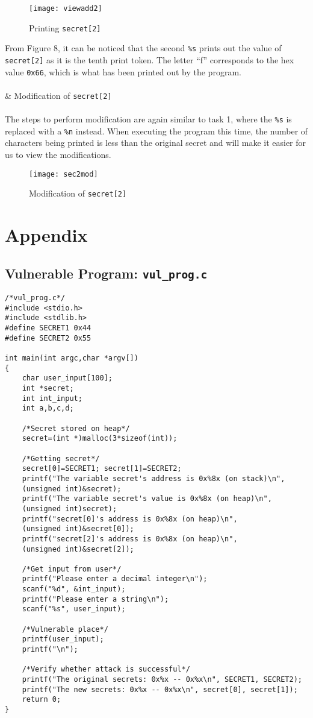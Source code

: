 \documentclass[a4paper,12pt]{article}
\newcommand*\circled[1]{\tikz[baseline=(char.base)]{
		\node[shape=circle,draw,inner sep=2pt] (char) {#1};}}
\begin{document}
\begin{figure}[H]
	\centering
	\texttt{[image: viewadd2]}
	\caption{Printing \texttt{secret[2]}}
	\label{fig:viewadd2}
\end{figure}
\noindent From Figure 8, it can be noticed that the second \texttt{\%s} prints out the value of \texttt{secret[2]} as it is the tenth print token. The letter ``f'' corresponds to the hex value \texttt{0x66}, which is what has been printed out by the program.\\\\
\circled{3} \& \circled{4} Modification of \texttt{secret[2]}\\\\The steps to perform modification are again similar to task 1, where the \texttt{\%s} is replaced with a \texttt{\%n} instead. When executing the program this time, the number of characters being printed is less than the original secret and will make it easier for us to view the modifications.
\begin{figure}[H]
	\centering
	\texttt{[image: sec2mod]}
	\caption{Modification of \texttt{secret[2]}}
	\label{fig:sec2mod}
\end{figure}

\newpage
\section{Appendix}
\subsection{Vulnerable Program: \texttt{vul\_prog.c}}
\begin{verbatim}
/*vul_prog.c*/
#include <stdio.h>
#include <stdlib.h>
#define SECRET1 0x44
#define SECRET2 0x55

int main(int argc,char *argv[])
{
    char user_input[100];
    int *secret;
    int int_input;
    int a,b,c,d;

    /*Secret stored on heap*/
    secret=(int *)malloc(3*sizeof(int));

    /*Getting secret*/
    secret[0]=SECRET1; secret[1]=SECRET2;
    printf("The variable secret's address is 0x%8x (on stack)\n", 
    (unsigned int)&secret);
    printf("The variable secret's value is 0x%8x (on heap)\n", 
    (unsigned int)secret);
    printf("secret[0]'s address is 0x%8x (on heap)\n", 
    (unsigned int)&secret[0]);
    printf("secret[2]'s address is 0x%8x (on heap)\n", 
    (unsigned int)&secret[2]);

    /*Get input from user*/
    printf("Please enter a decimal integer\n");
    scanf("%d", &int_input);
    printf("Please enter a string\n");
    scanf("%s", user_input);

    /*Vulnerable place*/
    printf(user_input);
    printf("\n");

    /*Verify whether attack is successful*/
    printf("The original secrets: 0x%x -- 0x%x\n", SECRET1, SECRET2);
    printf("The new secrets: 0x%x -- 0x%x\n", secret[0], secret[1]);
    return 0;
}
\end{verbatim}
\newpage
\end{document}
